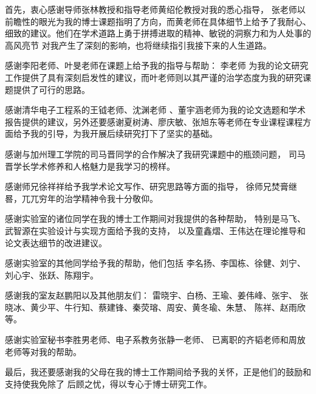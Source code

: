 
\begin{acknowledgements}
  首先，衷心感谢导师张林教授和指导老师黄绍伦教授对我的悉心指导，
  张老师以前瞻性的眼光为我的博士课题指明了方向，而黄老师在具体细节上给予了我耐心、
  细致的建议。他们在学术道路上勇于拼搏进取的精神、敏锐的洞察力和为人处事的高风亮节
  对我产生了深刻的影响，也将继续指引我接下来的人生道路。

  感谢李阳老师、叶旻老师在课题上给予我的指导与帮助：
  李老师 为我的论文研究工作提供了具有深刻启发性的建议，而叶老师则以其严谨的治学态度为我的研究课题提供了可行的思路。

 感谢清华电子工程系的王钺老师、沈渊老师 、董宇涵老师为我的论文选题和学术报告提供的建议，另外还要感谢夏树涛、廖庆敏、张旭东等老师在专业课程课程方面给予我的引导，为我开展后续研究打下了坚实的基础。
 
 感谢与加州理工学院的司马晋同学的合作解决了我研究课题中的瓶颈问题，
 司马晋学长学术修养和人格魅力是我学习的榜样。
 
 感谢师兄徐祥祥给予我学术论文写作、研究思路等方面的指导，
 徐师兄焚膏继晷，兀兀穷年的治学精神令我十分敬仰。
 
感谢实验室的诸位同学在我的博士工作期间对我提供的各种帮助，
特别是马飞、武智源在实验设计与实现方面给予我的支持，
以及童鑫熠、王伟达在理论推导和论文表达细节的改进建议。

感谢实验室的其他同学给予我的帮助，他们包括
李名扬、李国栋、徐健、刘宁、刘心宇、张跃、陈翔宇。

感谢我的室友赵鹏阳以及其他朋友们：
雷晓宇、白杨、王瑜、姜伟峰、张宇、
张晓冰、黄少平、牛行知、蔡建锋、秦荧瑢、周安、黄冬瑜、朱慧、
陈祥、赵雨欣等。

感谢实验室秘书李胜男老师、电子系教务张静一老师、
已离职的齐韬老师和周放老师等对我的帮助。

最后，我还要感谢我的父母在我的博士工作期间给予我的关怀，正是他们的鼓励和支持使我免除了
后顾之忧，得以专心于博士研究工作。
\end{acknowledgements}
